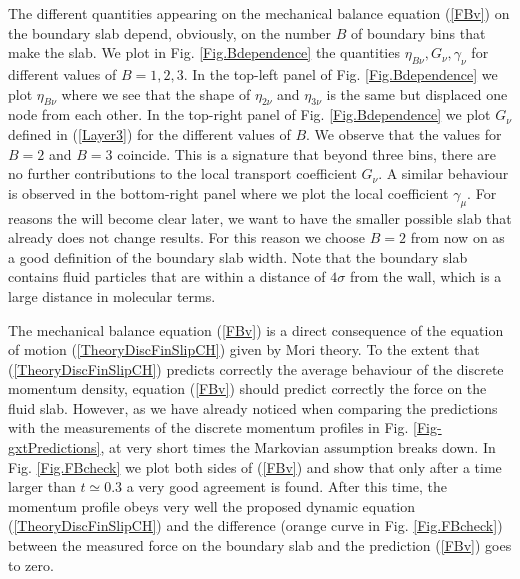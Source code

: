 \documentclass[b5paper,openright,10pt]{book}
\begin{document}
The different quantities appearing  on the mechanical balance equation
(\ref{FBv}) on the boundary slab  depend, obviously, on the number $B$
of   boundary  bins   that   make   the  slab.    We   plot  in   Fig.
\ref{Fig.Bdependence}  the  quantities  $\eta_{B\nu},G_\nu,\gamma_\nu$
for   different  values   of   $B=1,2,3$.   In   the   top-left  panel   of
Fig. \ref{Fig.Bdependence} we plot $\eta_{B\nu}$ where we see that the
shape of $\eta_{2\nu}$ and $\eta_{3\nu}$ is the same but displaced one
node    from    each    other.      In    the    top-right    panel    of
Fig. \ref{Fig.Bdependence}  we plot $G_\nu$ defined  in (\ref{Layer3})
for the different values of $B$.  We observe that the values for $B=2$
and $B=3$ coincide. This is a  signature that beyond three bins, there
are  no  further  contributions  to the  local  transport  coefficient
$G_\nu$. A similar behaviour is observed  in the bottom-right panel where we
plot the local  coefficient $\gamma_\mu$. For reasons  the will become
clear later,  we want to have  the smaller possible slab  that already
does not change  results. For this reason we choose  $B=2$ from now on
as  a good  definition  of  the boundary  slab  width.  Note that  the
boundary slab contains  fluid particles that are within  a distance of
$4\sigma$ from the wall, which is a large distance in molecular terms.

The  mechanical balance  equation (\ref{FBv})  is a  direct
consequence of  the equation of motion  (\ref{TheoryDiscFinSlipCH}) given by
Mori  theory.   To  the  extent  that  (\ref{TheoryDiscFinSlipCH})  predicts
correctly the average behaviour of  the discrete momentum density, equation
(\ref{FBv})  should predict  correctly the  force on  the fluid  slab.
However, as  we have  already noticed  when comparing  the predictions
with   the  measurements   of  the   discrete  momentum   profiles  in
Fig. \ref{Fig-gxtPredictions}, at very short  times the Markovian assumption breaks
down.  In Fig. \ref{Fig.FBcheck} we plot both sides of (\ref{FBv}) and
show that only  after a time larger than $t\simeq  0.3$ a very good
agreement is found.  After this  time, the momentum profile obeys very
well  the  proposed  dynamic equation  (\ref{TheoryDiscFinSlipCH})  and  the
difference (orange curve in  Fig. \ref{Fig.FBcheck}) between the measured
force  on the  boundary slab  and the  prediction (\ref{FBv})  goes to
zero.
\end{document}
